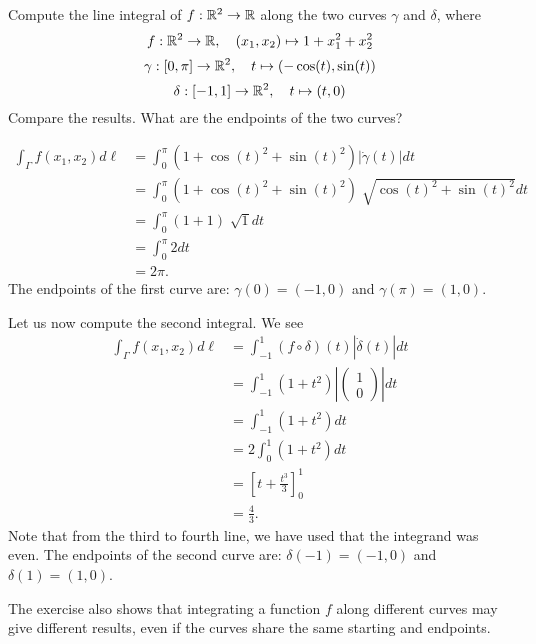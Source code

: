 \documentclass[11pt]{article}
\begin{document}
\begin{exercise}
    Compute the line integral of $f : \mathbb{R}^2 \rightarrow \mathbb{R}$ along the two curves $\gamma$ and $\delta$, 
    where 
    \[
        f : \mathbb{R}^2 \to \mathbb{R}, \quad (x_1,x_2) \mapsto 1 + x_1^2 + x_2^2
    \]
    \[
        \gamma : [0,\pi] \rightarrow \mathbb{R}^2, \quad t \mapsto ( -\cos(t), \sin(t) )
    \]
    \[
        \delta : [-1,1] \rightarrow \mathbb{R}^2, \quad t \mapsto (t,0)
    \]
    Compare the results. What are the endpoints of the two curves? 
\end{exercise}
\begin{solution}     
    \begin{align*}
        \int_{\Gamma} f(x_1,x_2) d\ell 
        &= \int_{0}^{\pi} ( 1 + \cos(t)^2 + \sin(t)^2 ) |\dot{\gamma}(t)|dt\\
        &= \int_{0}^{\pi} ( 1 + \cos(t)^2 + \sin(t)^2 ) \sqrt[]{\cos(t)^2 + \sin(t)^2} dt\\
        &= \int_{0}^{\pi} ( 1 + 1 ) \sqrt[]{1} dt\\
        &= \int_{0}^{\pi} 2 dt\\
        &= 2\pi.
    \end{align*}
    The endpoints of the first curve are: $\gamma(0) = (-1,0)$ and $\gamma(\pi) = (1,0)$.

    Let us now compute the second integral. We see 
    \begin{align*}
        \int_{\Gamma} f(x_1,x_2) d\ell 
        &= \int_{-1}^{1} (f\circ \delta)(t)|\dot{\delta}(t)|dt\\
        &= \int_{-1}^1 (1+t^2)\left|\begin{pmatrix} 1\\0 \end{pmatrix}\right| dt\\
        &= \int_{-1}^1 (1+t^2) dt\\
        &= 2 \int_{0}^1 (1+t^2) dt\\
        &= \left[t+\frac{t^3}{3} \right]_{0}^{1}\\
        &= \frac 4 3.
    \end{align*}
    Note that from the third to fourth line, we have used that the integrand was even. 
    The endpoints of the second curve are: $\delta(-1) = (-1,0)$ and $\delta(1) = (1,0)$.

    The exercise also shows that integrating a function $f$ along different curves may give different results, 
    even if the curves share the same starting and endpoints. 
\end{solution}
\end{document}
